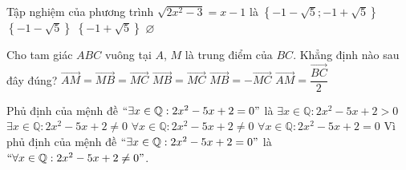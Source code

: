 \begin{ex}%
Tập nghiệm của phương trình $\sqrt{2x^2-3}=x-1$ là
\choice
{$\left\{-1-\sqrt{5};-1+\sqrt{5}\right\}$}
{$\left\{-1-\sqrt{5}\right\}$}
{\True $\left\{-1+\sqrt{5}\right\}$}
{$\varnothing$}
\end{ex}

\begin{ex}%
Cho tam giác $ABC$ vuông tại $A$, $M$ là trung điểm của $BC$. Khẳng định nào sau đây đúng?
\choice
{$\overrightarrow{AM}=\overrightarrow{MB}=\overrightarrow{MC}$}
{$\overrightarrow{MB}=\overrightarrow{MC}$}
{\True $\overrightarrow{MB}=-\overrightarrow{MC}$}
{$\overrightarrow{AM}=\dfrac{\overrightarrow{BC}}{2}$}
\end{ex}

\begin{ex}%
Phủ định của mệnh đề $``\exists x\in \mathbb{Q}:2x^2-5x+2=0"$ là
\choice
{$\exists x\in \mathbb{Q}:2x^2-5x+2>0$}
{$\exists x\in \mathbb{Q}:2x^2-5x+2\neq 0$}
{\True $\forall x\in \mathbb{Q}:2x^2-5x+2\neq 0$}
{$\forall x\in \mathbb{Q}:2x^2-5x+2=0$}
\loigiai
{
Vì phủ định của mệnh đề $``\exists x\in \mathbb{Q}:2x^2-5x+2=0"$ là $``\forall x\in \mathbb{Q}:2x^2-5x+2\neq 0"$.
}
\end{ex}

